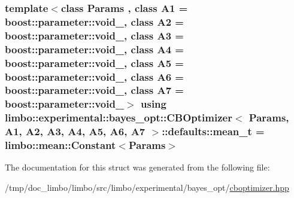 \subsubsection[{mean\+\_\+t}]{\setlength{\rightskip}{0pt plus 5cm}template$<$class Params , class A1  = boost\+::parameter\+::void\+\_\+, class A2  = boost\+::parameter\+::void\+\_\+, class A3  = boost\+::parameter\+::void\+\_\+, class A4  = boost\+::parameter\+::void\+\_\+, class A5  = boost\+::parameter\+::void\+\_\+, class A6  = boost\+::parameter\+::void\+\_\+, class A7  = boost\+::parameter\+::void\+\_\+$>$ using {\bf limbo\+::experimental\+::bayes\+\_\+opt\+::\+C\+B\+Optimizer}$<$ Params, A1, A2, A3, A4, A5, A6, A7 $>$\+::{\bf defaults\+::mean\+\_\+t} =  {\bf limbo\+::mean\+::\+Constant}$<$Params$>$}\label{structlimbo_1_1experimental_1_1bayes__opt_1_1_c_b_optimizer_1_1defaults_a102b232d75c97267704fa717bdeb8a9f}


The documentation for this struct was generated from the following file\+:\begin{DoxyCompactItemize}
\item 
/tmp/doc\+\_\+limbo/limbo/src/limbo/experimental/bayes\+\_\+opt/\hyperlink{cboptimizer_8hpp}{cboptimizer.\+hpp}\end{DoxyCompactItemize}
